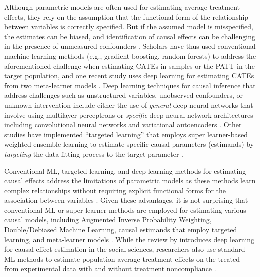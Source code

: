 Although parametric models are often used for estimating average
treatment effects, they rely on the assumption that the functional form
of the relationship between variables is correctly specified. But if the
assumed model is misspecified, the estimates can be biased, and
identification of causal effects can be challenging in the presence of
unmeasured confounders \citep{Jonzon2023, Tikka2023}. Scholars have thus
used conventional machine learning methods (e.g., gradient boosting,
random forests) to address the aforementioned challenge when estimating
CATEs in samples or the PATT in the target population, and one recent
study uses deep learning for estimating CATEs from two meta-learner
models \citep{Hartman2015PATE, Johansson2016learning, chernozhukov2018debiased, Yao2018representation, Kunzel2019meta, zhang2020learning, koch2024deepcausal}. Deep learning techniques for
causal inference that address challenges such as unstructured variables,
unobserved confounders, or unknown intervention include either the use
of \emph{general} deep neural networks that involve using multilayer
perceptrons or \emph{specific} deep neural network architectures including
convolutional neural networks and variational autoencoders
\citep{goodfellow2016deep, koch2024deepcausal}. Other studies have
implemented ``targeted learning'' that employs super learner-based
weighted ensemble learning to estimate specific causal parameters
(estimands) by \emph{targeting} the data-fitting process to the target
parameter \citep{vanderlaan2011targeted, Schuler2017targetedMLE}.

Conventional ML, targeted learning, and deep learning methods for
estimating causal effects address the limitations of parametric models
as these methods learn complex relationships without requiring explicit
functional forms for the association between variables
\citep{zhang2020learning, nie2021quasi, Okasa2022metalearners, Hu2022}.
Given these advantages, it is not surprising that conventional ML or
super learner methods are employed for estimating various causal models,
including Augmented Inverse Probability Weighting, Double/Debiased
Machine Learning, causal estimands that employ targeted learning, and
meta-learner models \citep{glynn2010introduction, vanderlaan2011targeted, chernozhukov2018debiased, knaus2022causalDML, bachDoubleML, Okasa2022metalearners}. While the review by \citet{koch2024deepcausal}
introduces deep learning for causal effect estimation in the social
sciences, researchers also use standard ML methods to estimate
population average treatment effects on the treated from experimental
data with and without treatment noncompliance \citep{Hartman2015PATE, balz2016targeted, ottoboni2020PATT}.

